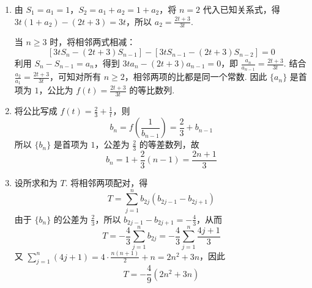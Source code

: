 \documentclass[UTF8,a4paper,oneside,11pt]{ctexbook}
\begin{document}
\begin{solution}
\begin{enumerate}
\item 由 \(S_1=a_1=1\)，\(S_2=a_1+a_2=1+a_2\)，将 \(n=2\) 代入已知关系式，得 \(3t(1+a_2)-(2t+3)=3t\)，所以 \(a_2=\frac{2t+3}{3t}\).

当 \(n\geqslant3\) 时，将相邻两式相减：
\[
\left[3tS_n-(2t+3)S_{n-1}\right]-\left[3tS_{n-1}-(2t+3)S_{n-2}\right]=0
\]
利用 \(S_n-S_{n-1}=a_n\)，得到 \(3ta_n-(2t+3)a_{n-1}=0\)，即 \(\frac{a_n}{a_{n-1}}=\frac{2t+3}{3t}\). 结合 \(\frac{a_2}{a_1}=\frac{2t+3}{3t}\)，可知对所有 \(n\geqslant2\)，相邻两项的比都是同一个常数. 因此 \(\{a_n\}\) 是首项为 \(1\)，公比为 \(f(t)=\frac{2t+3}{3t}\) 的等比数列.
\item 将公比写成 \(f(t)=\frac23+\frac1t\)，则
\[
b_n=f\left(\frac1{b_{n-1}}\right)=\frac23+b_{n-1}
\]
所以 \(\{b_n\}\) 是首项为 \(1\)，公差为 \(\frac23\) 的等差数列，故
\[
b_n=1+\frac23(n-1)=\frac{2n+1}{3}
\]
\item 设所求和为 \(T\). 将相邻两项配对，得
\[
T=\sum_{j=1}^{n}b_{2j}\left(b_{2j-1}-b_{2j+1}\right)
\]
由于 \(\{b_n\}\) 的公差为 \(\frac23\)，所以 \(b_{2j-1}-b_{2j+1}=-\frac43\)，从而
\[
T=-\frac43\sum_{j=1}^{n}b_{2j}=-\frac43\sum_{j=1}^{n}\frac{4j+1}{3}
\]
又 \(\sum_{j=1}^{n}(4j+1)=4\cdot\frac{n(n+1)}2+n=2n^2+3n\)，因此
\[
T=-\frac49(2n^2+3n)
\]
\end{enumerate}
\end{solution}

\end{document}
